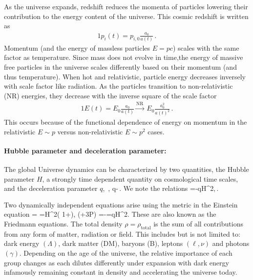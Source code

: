 As the universe expands, redshift reduces the momenta of particles lowering their contribution to the energy content of the universe. This cosmic redshift is written as
\begin{alignat}{1}
 \label{Redshift} p_{i}(t) = p_{i,0}\frac{a_{0}}{a(t)}\,.
\end{alignat}
Momentum (and the energy of massless particles $E=pc$) scales with the same factor as temperature. Since mass does not evolve in time,the energy of massive free particles in the universe  scales differently based on their momentum (and thus temperature). When hot and relativistic, particle energy decreases inversely with scale factor like radiation. As the particles transition to non-relativistic (NR) energies, they decrease with the inverse square of the scale factor
\begin{alignat}{1}
 \label{EScale} E(t) = E_{0}\frac{a_{0}}{a(t)}\xrightarrow{\mathrm{NR}}\ E_{0}\frac{a_{0}^{2}}{a(t)^{2}}\,.
\end{alignat}
This occurs because of the functional dependence of energy on momentum in the relativistic $E\sim p$ versus non-relativistic $E\sim p^{2}$ cases.

\paragraph{Hubble parameter and deceleration parameter:}
The global Universe dynamics can be characterized by two quantities, the Hubble parameter $H$, a strongly time dependent quantity on cosmological time scales, and the deceleration parameter $q$,
\beqn\label{dynamic}
\,,\qquad 
q\equiv -\,.
\eeqn
We note the relations
\beqn
 =-qH^2,\qquad{}\,. 
\eeqn

Two dynamically independent equations arise using the metric  in the Einstein equation 
\beqn\label{hubble}
 \rho = 
=H^2\left( 1+\right),
\qquad
{} (\rho+3P) =-=qH^2.
\eeqn
These are also known as the Friedmann equations. The total density $\rho=\rho_\mathrm{total}$ is the sum of all contributions from any form of matter, radiation or field. This includes but is not limited to: dark energy $(\Lambda)$, dark matter (DM), baryons (B), leptons $(\ell,\nu)$ and photons $(\gamma)$. Depending on the age of the universe, the relative importance of each group changes as each dilutes differently under expansion with dark energy infamously remaining constant in density and accelerating the universe today.

